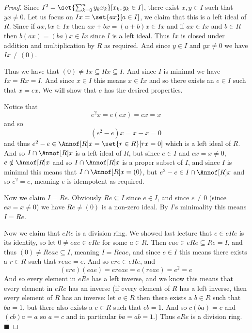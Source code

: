 \documentclass[10pt]{article}
\def\qed{%
    \ifmmode%
        \eqno\blacksquare%
    \else%
        \hskip1cm\allowbreak\hbox{}\nobreak\hfill$\blacksquare$%
    \fi%
}
\begin{document}
\begin{proof}

    Since $I^2=\set{\sum_{k=0}^n y_kx_k}[x_k,y_k\in I]$, there exist $x,y\in I$ such that $yx\neq0$.
    Let us focus on $Ix=\set{ax}[a\in I]$, we claim that this is a left ideal of $R$.
    Since if $ax,bx\in Ix$ then $ax+bx=(a+b)x\in Ix$ and if $ax\in Ix$ and $b\in R$ then $b(ax)=(ba)x\in Ix$ since $I$ is a left ideal.
    Thus $Ix$ is closed under addition and multiplication by $R$ as required.
    And since $y\in I$ and $yx\neq0$ we have $Ix\neq(0)$.

    Thus we have that $(0)\neq Ix\subseteq Rx\subseteq I$.
    And since $I$ is minimal we have $Ix=Rx=I$.
    And since $x\in I$ this means $x\in Ix$ and so there exists an $e\in I$ such that $x=ex$.
    We will show that $e$ has the desired properties.

    Notice that
    \[ e^2x = e(ex) = ex = x \]
    and so
    \[ (e^2-e)x = x - x = 0 \]
    and thus $e^2-e\in\Annof[R]x=\set{r\in R}[rx=0]$ which is a left ideal of $R$.
    And so $I\cap\Annof[R]x$ is a left ideal of $R$, but since $e\in I$ and $ex=x\neq0$, $e\notin\Annof[R]x$ and so $I\cap\Annof[R]x$ is a proper subset of $I$, and since $I$ is minimal this means that
    $I\cap\Annof[R]x=(0)$, but $e^2-e\in I\cap\Annof[R]x$ and so $e^2=e$, meaning $e$ is idempotent as required.

    Now we claim $I=Re$.
    Obviously $Re\subseteq I$ since $e\in I$, and since $e\neq0$ (since $ex=x\neq0$) we have $Re\neq(0)$ is a non-zero ideal.
    By $I$'s minimality this means $I=Re$.

    Now we claim that $eRe$ is a division ring.
    We showed last lecture that $e\in eRe$ is its identity, so let $0\neq eae\in eRe$ for some $a\in R$.
    Then $eae\in eRe\subseteq Re=I$, and thus $(0)\neq Reae\subseteq I$, meaning $I=Reae$, and since $e\in I$ this means there exists a $r\in R$ such that $reae=e$.
    And so $ere\in eRe$, and
    \[ (ere)(eae) = ereae = e(reae) = e^2 = e \]
    And so every element in $eRe$ has a left inverse, and we know this means that every element in $eRe$ has an inverse (if every element of $R$ has a left inverse, then every element of $R$ has an inverse:
    let $a\in R$ then there exists a $b\in R$ such that $ba=1$, but there also exists a $c\in R$ such that $cb=1$.
    And so $c(ba)=c$ and $(cb)a=a$ so $a=c$ and in particular $ba=ab=1$.)
    Thus $eRe$ is a division ring.
    \qed

\end{proof}
\end{document}
